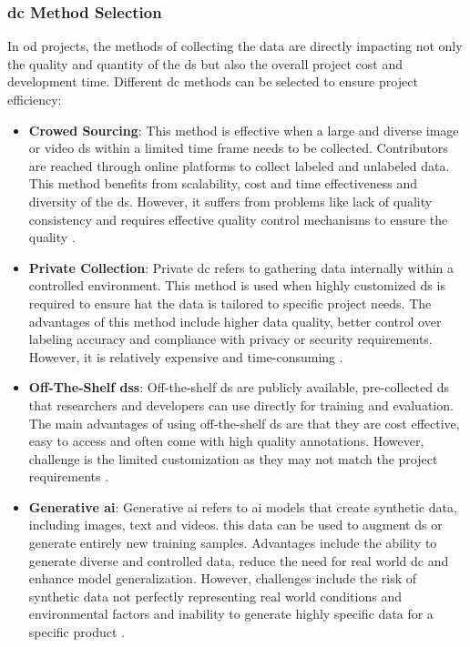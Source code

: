 \subsubsection{\gls{dc} Method Selection}
In \gls{od} projects, the methods of collecting the data are directly impacting not only the quality and quantity of the \gls{ds} but also the overall project cost and development time. Different \gls{dc} methods can be selected to ensure project efficiency:

\begin{itemize}
    \item \textbf{Crowed Sourcing}: This method is effective when a large and diverse image or video \gls{ds} within a limited time frame needs to be collected. Contributors are reached through online platforms to collect labeled and unlabeled data. This method benefits from scalability, cost and time effectiveness and diversity of the \gls{ds}. However, it suffers from problems like lack of quality consistency and requires effective quality control mechanisms to ensure the quality \cite{AIMultiple_Computer_Vision_Training_Data}.
    \item \textbf{Private Collection}: Private \gls{dc} refers to gathering data internally within a controlled environment. This method is used when highly customized \gls{ds} is required to ensure hat the data is tailored to specific project needs. The advantages of this method include higher data quality, better control over labeling accuracy and compliance with privacy or security requirements. However, it is relatively expensive and time-consuming \cite{AIMultiple_Computer_Vision_Training_Data}.
    \item \textbf{Off-The-Shelf \gls{ds}s}: Off-the-shelf \gls{ds} are publicly available, pre-collected \gls{ds} that researchers and developers can use directly for training and evaluation. The main advantages of using off-the-shelf \gls{ds} are that they are cost effective, easy to access and often come with high quality annotations. However, challenge is the limited customization as they may not match the project requirements \cite{AIMultiple_Computer_Vision_Training_Data}.
    \item \textbf{Generative \gls{ai}}: Generative \gls{ai} refers to \gls{ai} models that create synthetic data, including images, text and videos. this data can be used to augment \gls{ds} or generate entirely new training samples. Advantages include the ability to generate diverse and controlled data, reduce the need for real world \gls{dc} and enhance model generalization. However, challenges include the risk of synthetic data not perfectly representing real world conditions and environmental factors and inability to generate highly specific data for a specific product \cite{AIMultiple_Computer_Vision_Training_Data}.
\end{itemize}

